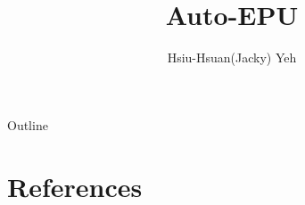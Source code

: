 \documentclass[11.5pt]{beamer}
\title{\huge{Auto-EPU}}
\author{Hsiu-Hsuan(Jacky) Yeh}
\date{}
\begin{document}
\maketitle


\begin{frame}{Outline}
\tableofcontents
\end{frame}


\begin{frame}{}
\end{frame}


\section{References}


\begin{frame}[allowframebreaks]{}
\renewcommand{\section}[2]{}%

\end{frame}
\end{document}
